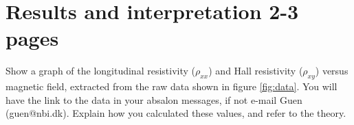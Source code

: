 \documentclass[a4paper]{article}
\begin{document}
\section{Results and interpretation 2-3 pages}
Show a graph of the longitudinal resistivity ($\rho_{xx}$) and Hall resistivity ($\rho_{xy}$) versus magnetic field, extracted from the raw data shown in figure \ref{fig:data}. You will have the link to the data in your absalon messages, if not e-mail Guen (guen@nbi.dk). Explain how you calculated these values, and refer to the theory.

\begin{comment} %
\subsection{Classical regime}
Calculate the sheet electron density $n_{s}$ and electron mobility $\mu$ from the data in the low-field regime, and refer to the theory in section \ref{sec:theory}. Explain how you retrieved the values from the data (did you use a linear fit?).
Round values off to 1 or 2 significant digits: 8.1643 ~= 8.2. Also, 5e-6 is easier to read than 0.000005.

!OBS: This part is optional (only if you have time left).
Calculate the uncertainty as follows: \newline $u(f(x, y, z)) = \sqrt{(\frac{\delta f}{\delta{x}} u(x))^{2} + (\frac{\delta f}{\delta{y}} u(y))^{2} + (\frac{\delta f}{\delta{z}} u(z))^{2}}$, where $f$ is the calculated value ($n_{s}$ or $\mu$), $x, y, z$ are the variables taken from the measurement and $u(x)$ is the uncertainty in x (and so on).

\subsection{Quantum regime}
Calculate $n_{s}$ for the high-field regime.
Show a graph of the longitudinal conductivity ($\rho_{xx}$) and Hall conductivity($\rho_{xy}$) \textbf{in units of the resistance quantum} ($\frac{h}{e^{2}}$), depicting the integer filling factors for each plateau.
Show a graph of the plateau number versus its corresponding value of $1/B$. From this you can determine the slope, which you use to calculate the electron density.
Again, calculate the uncertainty for your obtained values.
\end{comment} %
\end{document}
